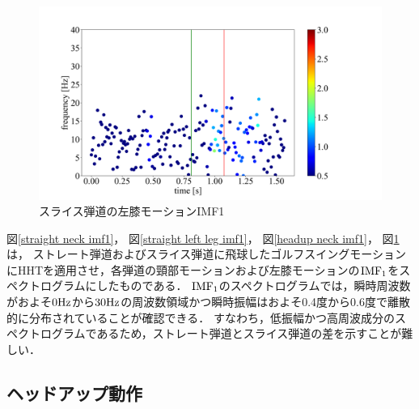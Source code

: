 \begin{figure}[tb]
    \centering
    \includegraphics[width=1.0\linewidth]{./images/opening_data/left_leg/IMF1.png}
    \caption{スライス弾道の左膝モーションIMF1}
    \label{opening left leg imf1}
\end{figure}

図\ref{straight neck imf1}，
図\ref{straight left leg imf1}，
図\ref{headup neck imf1}，
図\ref{opening left leg imf1}は，
ストレート弾道およびスライス弾道に飛球したゴルフスイングモーションにHHTを適用させ，各弾道の頸部モーションおよび左膝モーションの${\rm{IMF}}_{1}$をスペクトログラムにしたものである．
${\rm{IMF}}_{1}$のスペクトログラムでは，瞬時周波数がおよそ$0\rm{Hz}$から$30\rm{Hz}$の周波数領域かつ瞬時振幅はおよそ0.4度から0.6度で離散的に分布されていることが確認できる．
すなわち，低振幅かつ高周波成分のスペクトログラムであるため，ストレート弾道とスライス弾道の差を示すことが難しい．

\subsection{ヘッドアップ動作}

